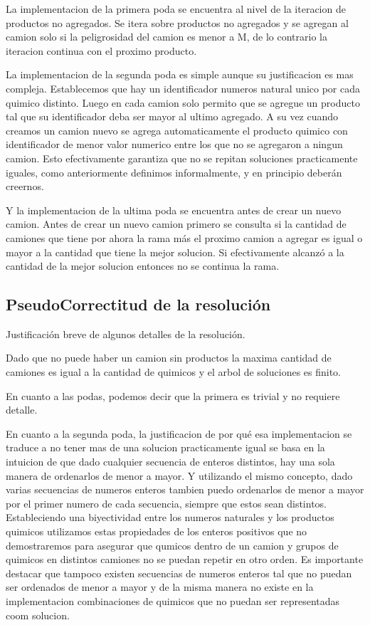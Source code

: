 La implementacion de la primera poda se encuentra al nivel de la iteracion de productos no agregados. Se itera sobre productos no agregados y se agregan al camion solo si la peligrosidad del camion es menor a M, de lo contrario la iteracion continua con el proximo producto.

La implementacion de la segunda poda es simple aunque su justificacion es mas compleja. Establecemos que hay un identificador numeros natural unico por cada quimico distinto. Luego en cada camion solo permito que se agregue un producto tal que su identificador deba ser mayor al ultimo agregado. A su vez cuando creamos un camion nuevo se agrega automaticamente el producto quimico con identificador de menor valor numerico entre los que no se agregaron a ningun camion. Esto efectivamente garantiza que no se repitan soluciones practicamente iguales, como anteriormente definimos informalmente, y en principio deber\'an creernos.


Y la implementacion de la ultima poda se encuentra antes de crear un nuevo camion. Antes de crear un nuevo camion primero se consulta si la cantidad de camiones que tiene por ahora la rama m\'as el proximo camion a agregar es igual o mayor a la cantidad que tiene la mejor solucion. Si efectivamente alcanz\'o a la cantidad de la mejor solucion entonces no se continua la rama.
 


\subsection{PseudoCorrectitud de la resoluci\'on}


Justificaci\'on breve de algunos detalles de la resoluci\'on.

Dado que no puede haber un camion sin productos la maxima cantidad de camiones es igual a la cantidad de quimicos y el arbol de soluciones es finito.


En cuanto a las podas, podemos decir que la primera es trivial y no requiere detalle.

En cuanto a la segunda poda, la justificacion de por qu\'e esa implementacion se traduce a no tener mas de una solucion practicamente igual se basa en la intuicion de que dado cualquier secuencia de enteros distintos, hay una sola manera de ordenarlos de menor a mayor. Y utilizando el mismo concepto, dado varias secuencias de numeros enteros tambien puedo ordenarlos de menor a mayor por el primer numero de cada secuencia, siempre que estos sean distintos. 
Estableciendo una biyectividad entre los numeros naturales y los productos quimicos utilizamos estas propiedades de los enteros positivos que no demostraremos para asegurar que qumicos dentro de un camion y grupos de quimicos en distintos camiones no se puedan repetir en otro orden.
Es importante destacar que tampoco existen secuencias de numeros enteros tal que no puedan ser ordenados de menor a mayor y de la misma manera no existe en la implementacion combinaciones de quimicos que no puedan ser representadas coom solucion. 

